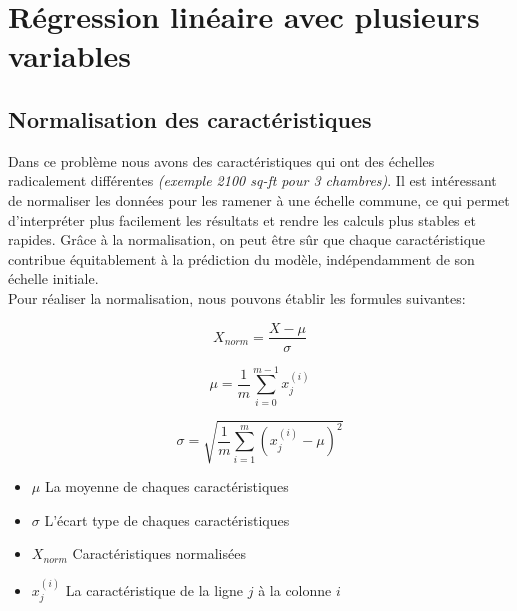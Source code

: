 \section{Régression linéaire avec plusieurs variables}
\subsection{Normalisation des caractéristiques}

Dans ce problème nous avons des caractéristiques qui ont des échelles radicalement différentes \textit{(exemple 2100 sq-ft pour 3 chambres)}. Il est intéressant de normaliser les données pour les ramener à une échelle commune, 
ce qui permet d'interpréter plus facilement les résultats et rendre les calculs plus stables et rapides. Grâce à la normalisation, on peut être sûr que chaque caractéristique contribue équitablement à la prédiction du modèle, indépendamment de son échelle initiale. \\

\noindent
Pour réaliser la normalisation, nous pouvons établir les formules suivantes:

\begin{figure}[!h]
    \centering
    \begin{minipage}{.33\linewidth}
        \begin{equation*}
            X_{norm} = \frac{X - \mu}{\sigma}
        \end{equation*}
    \end{minipage}\hfill\vline
    \begin{minipage}{.33\linewidth}
        \begin{equation*}
            \mu = \frac{1}{m} \sum_{i=0}^{m-1}x_j^{(i)}
        \end{equation*}        
    \end{minipage}\hfill\vline
    \begin{minipage}{.33\linewidth}
        \begin{equation*}
            \sigma = \sqrt{\frac{1}{m} \sum_{i=1}^{m} \left(x_j^{(i)} - \mu\right)^2}
        \end{equation*}                
    \end{minipage}
\end{figure}

\begin{itemize}
    \item $\mu$ La moyenne de chaques caractéristiques
    \item $\sigma$ L'écart type de chaques caractéristiques
    \item $X_{norm}$ Caractéristiques normalisées
    \item $x_j^{(i)}$ La caractéristique de la ligne $j$ à la colonne $i$
\end{itemize}

